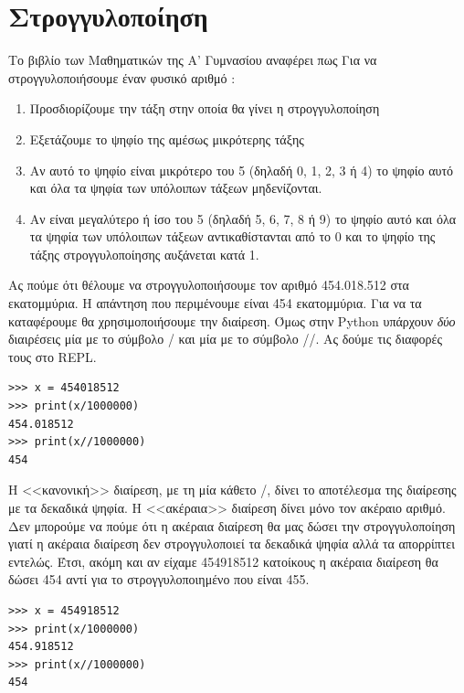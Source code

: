 \section{Στρογγυλοποίηση}
Το βιβλίο των Μαθηματικών της Α' Γυμνασίου αναφέρει πως
Για να στρογγυλοποιήσουμε έναν φυσικό αριθμό :
\begin{enumerate}
	\item Προσδιορίζουμε την τάξη στην οποία θα γίνει η στρογγυλοποίηση
	\item Εξετάζουμε το ψηφίο της αμέσως μικρότερης τάξης
	\item Αν αυτό το ψηφίο είναι μικρότερο του 5 (δηλαδή 0, 1, 2, 3 ή 4) το ψηφίο αυτό και όλα τα ψηφία των υπόλοιπων τάξεων μηδενίζονται.
	\item Αν είναι μεγαλύτερο ή ίσο του 5 (δηλαδή 5, 6, 7, 8 ή 9) το ψηφίο αυτό και όλα τα ψηφία των υπόλοιπων τάξεων αντικαθίστανται από το 0 και το ψηφίο της τάξης στρογγυλοποίησης αυξάνεται κατά 1.
\end{enumerate}

Ας πούμε ότι θέλουμε να στρογγυλοποιήσουμε τον αριθμό 454.018.512 στα εκατομμύρια. Η απάντηση που περιμένουμε είναι 454 εκατομμύρια.
Για να τα καταφέρουμε θα χρησιμοποιήσουμε την διαίρεση. Όμως στην Python υπάρχουν \emph{δύο} διαιρέσεις μία με το σύμβολο / και μία με το σύμβολο //. Ας δούμε τις διαφορές τους στο REPL.
\begin{lstlisting}
>>> x = 454018512
>>> print(x/1000000)
454.018512
>>> print(x//1000000)
454
\end{lstlisting}
Η <<κανονική>> διαίρεση, με τη μία κάθετο /, δίνει το αποτέλεσμα της διαίρεσης με τα δεκαδικά ψηφία. Η <<ακέραια>> διαίρεση δίνει μόνο τον ακέραιο αριθμό. Δεν μπορούμε να πούμε ότι η ακέραια διαίρεση θα μας δώσει την στρογγυλοποίηση γιατί η ακέραια διαίρεση δεν στρογγυλοποιεί τα δεκαδικά ψηφία αλλά τα απορρίπτει εντελώς. Έτσι, ακόμη και αν είχαμε 454918512 κατοίκους η ακέραια διαίρεση θα δώσει 454 αντί για το στρογγυλοποιημένο που είναι 455.
\begin{lstlisting}
>>> x = 454918512
>>> print(x/1000000)
454.918512
>>> print(x//1000000)
454
\end{lstlisting}

